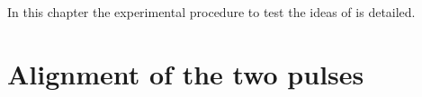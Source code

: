 In this chapter the  experimental procedure to test the ideas of  is detailed.



%







\section{Alignment of the two pulses}


